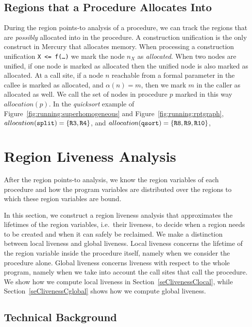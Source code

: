 \documentclass{tlp}
\newcommand{\allocation}[1]{\ensuremath{{allocation}(#1)}}
\newcommand{\code}[1]{{\tt#1}}
\begin{document}
\subsection{Regions that a Procedure Allocates Into}
\label{seCallocCregions}

During the region points-to analysis of a procedure,
we can track the regions
that are \emph{possibly} allocated into in the procedure.
A construction unification is the only construct in Mercury
that allocates memory.
When processing a construction unification \code{X <= f(\ldots)}
we mark the node $n_X$ as \emph{allocated}.
When two nodes are unified, if one node is marked as allocated
then the unified node is also marked as allocated.
At a call site,
if a node $n$ reachable from a formal parameter in the callee
is marked as allocated,
and $\alpha(n) = m$,
then we mark $m$ in the caller as allocated as well.
We call the set of nodes in procedure $p$ marked in this way \allocation{p}.
In the \emph{quicksort} example of
Figure~\ref{fig:running:superhomogeneous}
and Figure~\ref{fig:running:rptgraph},
$\allocation{\code{split}} = \{\code{R3}, \code{R4}\}$, and
$\allocation{\code{qsort}} = \{\code{R8}, \code{R9}, \code{R10}\}$,

\section{Region Liveness Analysis}
\label{seClra}

After the region points-to analysis,
we know the region variables of each procedure
and how the program variables are distributed
over the regions to which these region variables are bound.

In this section, we construct a region liveness analysis
that approximates the lifetimes of the region variables,
i.e.\ their liveness,
to decide when a region needs to be created
and when it can safely be reclaimed.
We make a distinction between local liveness and global liveness.
Local liveness concerns the lifetime of the region variable
inside the procedure itself, namely when we consider the procedure alone.
Global liveness concerns liveness with respect to the whole program,
namely when we take into account the call sites that call the procedure.
We show how we compute local liveness in Section~\ref{seClivenessClocal},
while Section~\ref{seClivenessCglobal} shows how we compute global liveness.

\subsection{Technical Background}
\end{document}

